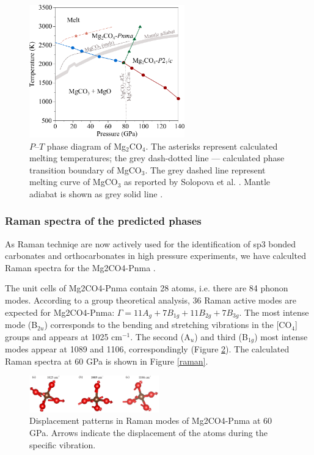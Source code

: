 \documentclass[a4paperm]{article}
\begin{document}
\begin{figure}[H]
	\centering
	\includegraphics[width=0.6\textwidth]{phdia_mg2co4}
	\caption{$P$--$T$ phase diagram of Mg$_2$CO$_4$. The asterisks represent calculated melting temperatures;  the grey dash-dotted line --- calculated phase transition boundary of MgCO$_3$. The grey dashed line represent melting curve of MgCO$_3$ as reported by Solopova et al. \cite{solopova2015}. Mantle adiabat is shown as grey solid line \cite{katsura2010}.} 
\label{phdia}
\end{figure}


\subsubsection*{Raman spectra of the predicted phases}

As Raman techniqe are now actively used for the identification of sp3 bonded carbonates and orthocarbonates in high pressure experiments, we have calculted Raman spectra for the Mg2CO4-Pnma \cite{lobanov2017_caco3, binck2020_mgco3, spahr2021_sr2co4}.

The unit cells of Mg2CO4-Pnma contain 28 atoms, i.e. there are 84 phonon modes. 
According to a group theoretical analysis, 36 Raman active modes are expected for Mg2CO4-Pnma: $\Gamma = 11A_g + 7B_{1g} + 11B_{2g} + 7B_{3g}$. 
The most intense mode (B$_{2u}$) corresponds to the bending and stretching vibrations in the [CO$_4$] groups and appears at 1025 cm$^{-1}$. 
The second (A$_u$) and third (B$_{1g}$) most intense modes appear at 1089 and 1106, correspondingly (Figure \ref{displ}). The calculated Raman spectra at 60 GPa is shown in Figure \ref{raman}.

\begin{figure}
	\includegraphics[width=0.5\textwidth]{dis_pat} \centering
	\caption{Displacement patterns in Raman modes of Mg2CO4-Pnma at 60 GPa. Arrows indicate the displacement of the atoms during the specific vibration.} \label{displ}
\end{figure}
\end{document}
